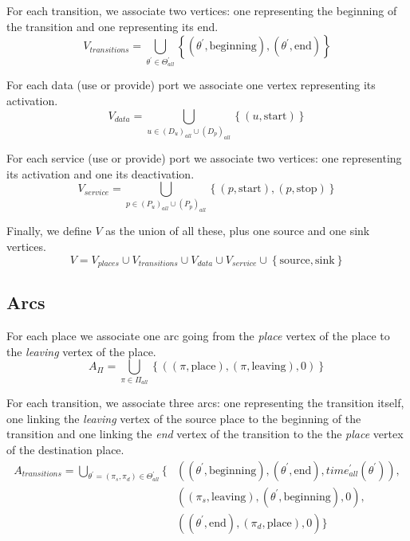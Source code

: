 For each transition, we associate two vertices: one representing the
beginning of the transition and one representing its end. 
\[
V_{transitions}=\bigcup_{\theta^{\prime}\in\Theta_{all}^{\prime}}\left\{ \left(\theta^{\prime},\text{beginning}\right),\left(\theta^{\prime},\text{end}\right)\right\} 
\]

For each data (use or provide) port we associate one vertex representing
its activation. 
\[
V_{data}=\bigcup_{u\in\left(D_{u}\right)_{all}\cup\left(D_{p}\right)_{all}}\left\{ \left(u,\text{start}\right)\right\} 
\]

For each service (use or provide) port we associate two vertices:
one representing its activation and one its deactivation. 
\[
V_{service}=\bigcup_{p\in\left(P_{u}\right)_{all}\cup\left(P_{p}\right)_{all}}\left\{ \left(p,\text{start}\right),\left(p,\text{stop}\right)\right\} 
\]

Finally, we define $V$ as the union of all these, plus one source
and one sink vertices. 
\[
V=V_{places}\cup V_{transitions}\cup V_{data}\cup V_{service}\cup\left\{ \text{source},\text{sink}\right\} 
\]


\subsection{Arcs}

For each place we associate one arc going from the \emph{place} vertex of
the place to the \emph{leaving} vertex of the place.
\[
A_{\Pi}=\bigcup_{\pi\in\Pi_{all}}\left\{ \left(\left(\pi,\text{place}\right),\left(\pi,\text{leaving}\right),0\right)\right\} 
\]

For each transition, we associate three arcs: one representing the
transition itself, one linking the \emph{leaving} vertex of the source
place to the beginning of the transition and one linking the \emph{end}
vertex of the transition to the the \emph{place} vertex of the destination
place. 
\begin{align*}
A_{transitions}=\bigcup_{\theta^{\prime}=\left(\pi_{s},\pi_{d}\right)\in\Theta_{all}^{\prime}}\{ & \left(\left(\theta^{\prime},\text{beginning}\right),\left(\theta^{\prime},\text{end}\right),time_{all}^{\prime}\left(\theta^{\prime}\right)\right),\\
 & \left(\left(\pi_{s},\text{leaving}\right),\left(\theta^{\prime},\text{beginning}\right),0\right),\\
 & \left(\left(\theta^{\prime},\text{end}\right),\left(\pi_{d},\text{place}\right),0\right)\}
\end{align*}

